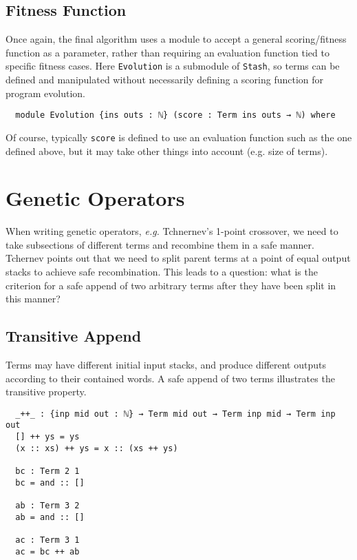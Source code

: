 \documentclass[runningheads,a4paper]{llncs}
\begin{document}
\subsection{Fitness Function}

Once again, the final algorithm uses a module to accept a general scoring/fitness
function as a parameter, rather than requiring an evaluation function
tied to specific fitness cases. Here \texttt{Evolution} is a submodule
of \texttt{Stash}, so terms can be defined and manipulated without
necessarily defining a scoring function for program evolution.

\begin{verbatim}
  module Evolution {ins outs : ℕ} (score : Term ins outs → ℕ) where
\end{verbatim}

Of course, typically \texttt{score} is defined to use an evaluation
function such as the one defined above, but it may take other things
into account (e.g. size of terms).

\section{Genetic Operators}

When writing genetic operators, \textit{e.g.} Tchnernev's \cite{tchernev:forthcross}
1-point crossover, we need to take subsections of different terms and recombine
them in a safe manner. Tchernev points out that we need to split parent terms at a
point of equal output stacks to achieve safe recombination. This leads to a question:
what is the criterion for a safe append of two arbitrary terms after
they have been split in this manner?

\subsection{Transitive Append}

Terms may have different initial input stacks, and produce
different outputs according to their contained words. A safe append
of two terms illustrates the transitive property. 

\begin{verbatim}
  _++_ : {inp mid out : ℕ} → Term mid out → Term inp mid → Term inp out
  [] ++ ys = ys
  (x :: xs) ++ ys = x :: (xs ++ ys)

  bc : Term 2 1
  bc = and :: []

  ab : Term 3 2
  ab = and :: []

  ac : Term 3 1
  ac = bc ++ ab
\end{verbatim}
\end{document}
